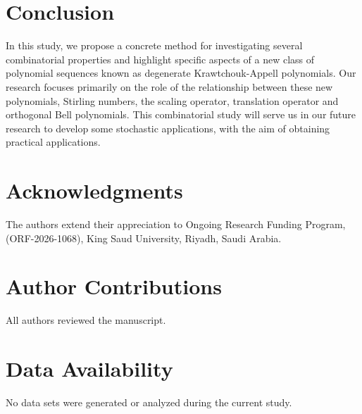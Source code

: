 \documentclass{birkjour}
\theoremstyle{definition}
\theoremstyle{remark}
\numberwithin{equation}{section}
\begin{document}
\section*{Conclusion}
In this study, we propose a concrete method for investigating
several combinatorial properties and highlight specific aspects of a
new class of polynomial sequences known as degenerate
Krawtchouk-Appell polynomials. Our research focuses primarily on the
role of the relationship between these new polynomials, Stirling
numbers, the scaling operator, translation operator and orthogonal
Bell polynomials. This combinatorial study will serve us in our
future research to develop some stochastic applications, with the
aim of obtaining practical applications.


\section*{Acknowledgments}
The authors extend their appreciation to Ongoing Research Funding Program, (ORF-2026-1068), King Saud University, Riyadh, Saudi Arabia.
\section*{Author Contributions}
All authors reviewed the manuscript.
\section*{Data Availability}
No data sets were generated or analyzed during the current study.
\end{document}
